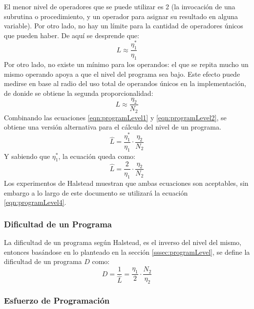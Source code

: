 \documentclass[letterpaper,12pt]{article}
\begin{document}
El menor nivel de operadores que se puede utilizar es 2 (la invocación de una subrutina o procedimiento, y un operador para asignar su resultado en alguna variable). Por otro lado, no hay un límite para la cantidad de operadores únicos que pueden haber. De aquí se desprende que:
\begin{equation}
  \label{eqn:programLevel1}
  L \approx \frac{\eta_{1}^{*}}{\eta_{1}}
\end{equation}
Por otro lado, no existe un mínimo para los operandos: el que se repita mucho un mismo operando apoya a que el nivel del programa sea bajo. Este efecto puede medirse en base al radio del uso total de operandos únicos en la implementación, de donide se obtiene la segunda proporcionalidad:
\begin{equation}
  \label{eqn:programLevel2}
  L \approx \frac{\eta_{2}}{N_{2}}
\end{equation}
Combinando las ecuaciones \ref{eqn:programLevel1} y \ref{eqn:programLevel2}, se obtiene una versión alternativa para el cálculo del nivel de un programa.
\begin{equation}
  \label{eqn:programLevel3}
  \hat{L} = \frac{\eta_{1}^{*}}{\eta_{1}} \cdot \frac{\eta_{2}}{N_{2}}
\end{equation}
Y sabiendo que $\eta_{1}^{*}$, la ecuación queda como:
\begin{equation}
  \label{eqn:programLevel4}
  \hat{L} = \frac{2}{\eta_{1}} \cdot \frac{\eta_{2}}{N_{2}}
\end{equation}
Los experimentos de Halstead muestran que ambas ecuaciones son aceptables, sin embargo a lo largo de este documento se utilizará la ecuación \ref{eqn:programLevel4}.

\subsubsection{Dificultad de un Programa}

La dificultad de un programa según Halstead, es el inverso del nivel del mismo, entonces basándose en lo planteado en la sección \ref{sssec:programLevel}, se define la dificultad de un programa $D$ como:
\begin{equation}
  D = \frac{1}{\hat{L}} = \frac{\eta_{1}}{2} \cdot \frac{N_{2}}{\eta_{2}}
\end{equation}

\subsubsection{Esfuerzo de Programación}
\end{document}

